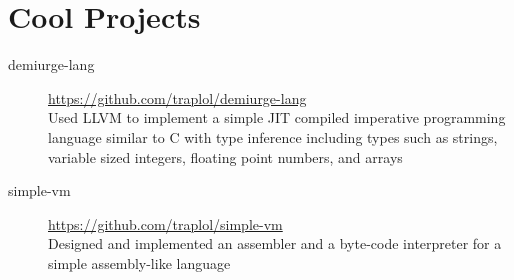 \documentclass[10pt]{article} %
\begin{document}
\section{Cool Projects}
\vspace{-3mm}

\begin{description}
\item[demiurge-lang]
{\footnotesize \href{https://github.com/traplol/demiurge-lang}{https://github.com/traplol/demiurge-lang}} \\
Used LLVM to implement a simple JIT compiled imperative programming language similar to C with type inference including types such as strings, variable sized integers, floating point numbers, and arrays

\item[simple-vm]
{\footnotesize \href{https://github.com/traplol/simple-vm}{https://github.com/traplol/simple-vm}} \\
Designed and implemented an assembler and a byte-code interpreter for a simple assembly-like language
\end{description}
\end{document}
